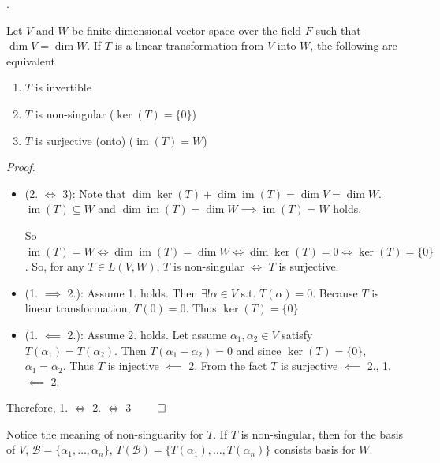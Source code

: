 \documentclass[8pt]{beamer}
\newcommand{\mc}[1]{\mathcal{#1}}
\newcommand{\ti}[1]{\textit{#1}}
\newcommand{\im}{\operatorname{im}}
\begin{document}
\begin{frame}{.}
    \begin{theorem}
        Let $V$ and $W$ be finite-dimensional vector space over the field $F$ such that $\dim V = \dim W$. If $T$ is a linear transformation from $V$ into $W$, the following are equivalent
        \begin{enumerate}
            \item $T$ is invertible
            \item $T$ is non-singular ($\ker(T) = \{0\}$)
            \item $T$ is surjective (onto) ($\im(T) = W$)
        \end{enumerate}

        \ti{Proof.}
        \begin{itemize}
            \item (2. $\iff$ 3): Note that $\dim \ker (T) + \dim \im (T) = \dim V = \dim W$. $\im(T) \subseteq W$ and $\dim \im(T) = \dim W \implies \im(T) = W$ holds.

            So $\im(T) = W \iff \dim \im(T) = \dim W \iff \dim \ker (T) = 0 \iff \ker (T) = \{0\}$. So, for any $T \in L(V,W)$, $T$ is non-singular $\iff$ $T$ is surjective.
            \item (1. $\implies$ 2.): Assume 1. holds. Then $\exists! \alpha \in V$ s.t. $T(\alpha) = 0$. Because $T$ is linear transformation, $T(0) = 0$. Thus $\ker(T) =\{0\}$
            \item (1. $\impliedby$ 2.): Assume 2. holds. Let assume $\alpha_1, \alpha_2 \in V$ satisfy $T(\alpha_1) = T(\alpha_2)$. Then $T(\alpha_1 - \alpha_2) =0$ and since $\ker(T) = \{0\}$, $\alpha_1 = \alpha_2$. Thus $T$ is injective $\impliedby$ 2. From the fact $T$ is surjective $\impliedby$ 2., 1. $\impliedby$ 2.
        \end{itemize}
        Therefore, 1. $\iff$ 2. $\iff$ 3  $\qed$

        Notice the meaning of non-singuarity for $T$. If $T$ is non-singular, then for the basis of $V$, $\mc{B} = \{\alpha_1, \dots, \alpha_n\}$, $T(\mc{B}) = \{T(\alpha_1), \dots, T(\alpha_n)\}$ consists basis for $W$.
    \end{theorem}
\end{frame}
\end{document}

